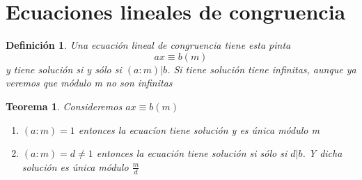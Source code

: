\documentclass{article}
\theoremstyle{break}
\newtheorem{theorem}{Teorema}[section]
\newtheorem{definition}{Definición}[section]
\begin{document}
        \section{Ecuaciones lineales de congruencia}

        \begin{definition}
            Una ecuación lineal de congruencia tiene esta pinta $$ ax \equiv b (m)$$
            y tiene solución si y sólo si $(a:m) | b$. Si tiene solución tiene infinitas, aunque ya veremos
            que módulo m no son infinitas
        \end{definition}
        \begin{theorem}
            Consideremos $ax\equiv b (m)$
            \begin{enumerate}
                \item $(a:m) = 1$ entonces la ecuacíon tiene solución y es única módulo m
                \item $(a:m) =d\neq 1$ entonces la ecuación tiene solución si sólo si $d|b$. Y dicha solución
                es única módulo $\frac{m}{d}$
            \end{enumerate}
        \end{theorem}
\end{document}

